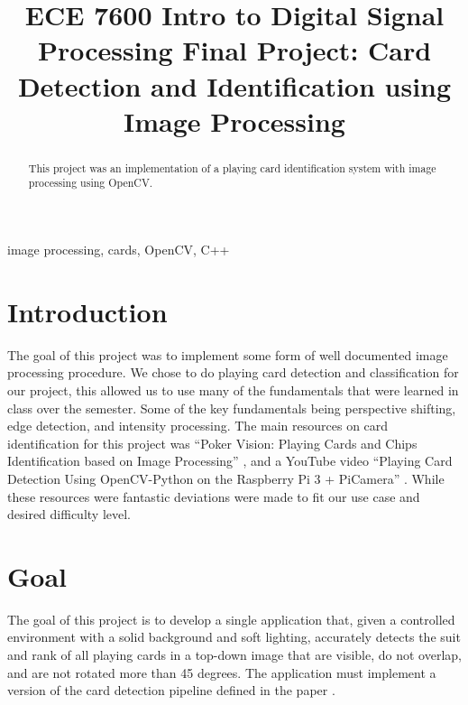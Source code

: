 \documentclass[conference]{IEEEtran}
\begin{document}
\title{ECE 7600 Intro to Digital Signal Processing Final Project:
Card Detection and Identification using Image Processing
}

\author{
\and
{}
}

\maketitle

\begin{abstract}
    This project was an implementation of a playing card identification system with image processing
    using OpenCV.
\end{abstract}

\begin{IEEEkeywords}
image processing, cards, OpenCV, C++
\end{IEEEkeywords}

\section{Introduction}
The goal of this project was to implement some form of well documented image processing procedure.
We chose to do playing card detection and classification for our project, this allowed us to use
many of the fundamentals that were learned in class over the semester. Some of the key fundamentals
being perspective shifting, edge detection, and intensity processing. The main resources on card
identification for this project was ``Poker Vision: Playing Cards and Chips Identification based on
Image Processing'' \cite{poker-vision}, and a YouTube video ``Playing Card Detection Using
OpenCV-Python on the Raspberry Pi 3 + PiCamera'' \cite{opencv-card-detection}. While these
resources were fantastic deviations were made to fit our use case and desired difficulty level.

\section{Goal}
The goal of this project is to develop a single application that, given a controlled environment
with a solid background and soft lighting, accurately detects the suit and rank of all playing cards
in a top-down image that are visible, do not overlap, and are not rotated more than 45 degrees. The
application must implement a version of the card detection pipeline defined in the paper
\cite{poker-vision}.
\end{document}
